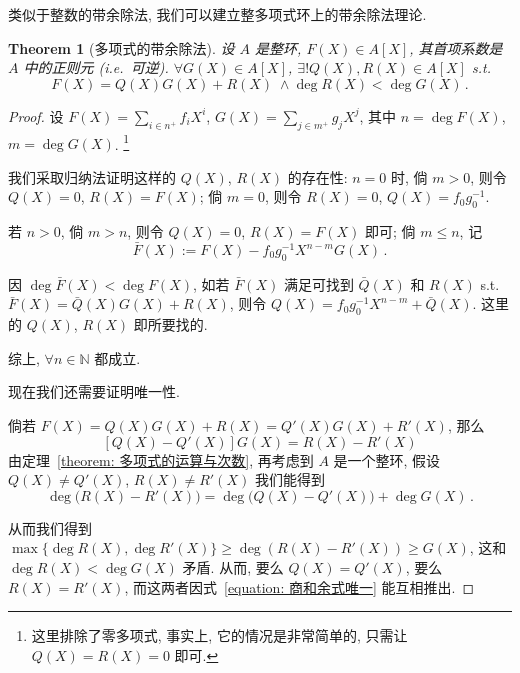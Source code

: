 \documentclass[openany]{ctexbook}
\theoremstyle{plain}
\newtheorem{theorem}{Theorem}[section] %
\theoremstyle{definition}
\begin{document}
类似于整数的带余除法, 我们可以建立整多项式环上的带余除法理论.

\begin{theorem}[多项式的带余除法]\label{theorem: 多项式的带余除法}
	设 $A$ 是整环, $F(X) \in A[X]$, 其首项系数是 $A$ 中的正则元 (i.e.\ 可逆). 
	$\forall G(X) \in A[X]$, $\exists! Q(X), R(X) \in A[X]$ s.t.\ 
	\begin{equation*}
		F(X) = Q(X) G(X) + R(X)\; \wedge \deg R(X) < \deg G(X)\,.
	\end{equation*}
\end{theorem}
\begin{proof}
	设 $F(X) = \sum_{i \in n^+} f_i X^i$, $G(X) = \sum_{j \in m^+} g_j X^j$, 其中 $n = \deg F(X)$, $m = \deg G(X)$. \footnote{这里排除了零多项式, 事实上, 它的情况是非常简单的, 只需让 $Q(X) = R(X) = 0$ 即可.} 

	我们采取归纳法证明这样的 $Q(X)$, $R(X)$ 的存在性:
	$n = 0$ 时, 倘 $m > 0$, 则令 $Q(X) = 0$, $R(X) = F(X)$; 
	倘 $m = 0$, 则令 $R(X) = 0$, $Q(X) = f_0 g_0^{-1}$.

	若 $n > 0$, 倘 $m > n$, 则令 $Q(X) = 0$, $R(X) = F(X)$ 即可;
	倘 $m \leq n$, 记
	\begin{equation*}
		\bar F(X) := F(X) - f_0 g_0^{-1} X^{n - m} G(X)\,.
	\end{equation*}

	因 $\deg \bar F(X) < \deg F(X)$, 如若 $\bar F(X)$ 满足可找到 $\bar Q(X)$ 和 $R(X)$ s.t.\ $\bar F(X) = \bar Q(X) G(X) + R(X)$, 则令 $Q(X) = f_0 g_0^{-1} X^{n - m} + \bar Q(X)$. 
	这里的 $Q(X)$, $R(X)$ 即所要找的.

	综上, $\forall n \in \mathbb N$ 都成立.

	现在我们还需要证明唯一性.

	倘若 $F(X) = Q(X) G(X) + R(X) = Q'(X) G(X) + R'(X)$, 那么
	\begin{equation}\label{equation: 商和余式唯一}
		[Q(X) - Q'(X)] G(X) = R(X) - R'(X)
	\end{equation}
	由定理~\ref{theorem: 多项式的运算与次数}, 再考虑到 $A$ 是一个整环, 假设 $Q(X) \neq Q'(X)$, $R(X) \neq R'(X)$ 我们能得到
	\begin{equation*}
		\deg \big(R(X) - R'(X)\big) = \deg \big( Q(X) - Q'(X)\big) + \deg G(X)\,.
	\end{equation*}

	从而我们得到 $\max\{\deg R(X), \deg R'(X) \} \geq \deg(R(X) - R'(X)) \geq G(X)$, 这和 $\deg R(X) < \deg G(X)$ 矛盾. 从而, 要么 $Q(X) = Q'(X)$, 要么 $R(X) = R'(X)$, 而这两者因式~\ref{equation: 商和余式唯一} 能互相推出.
\end{proof}
\end{document}
